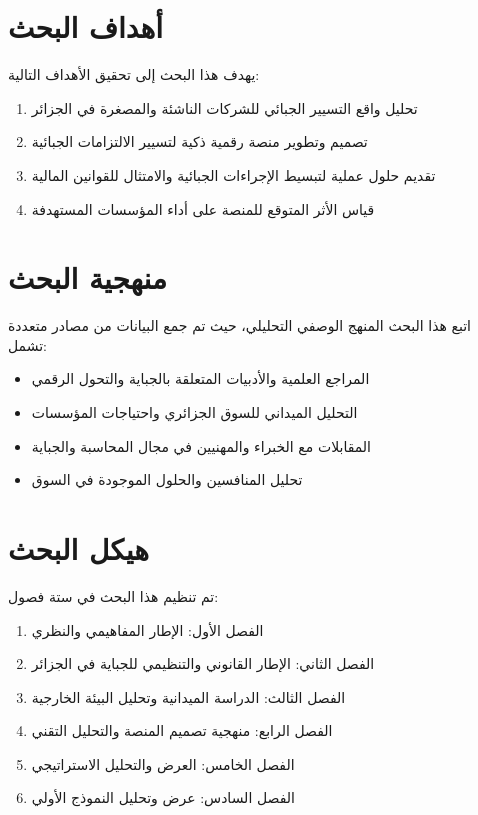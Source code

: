 \documentclass[12pt, a4paper, twoside]{report}
\begin{document}
\section{أهداف البحث}

يهدف هذا البحث إلى تحقيق الأهداف التالية:
\begin{enumerate}
    \item تحليل واقع التسيير الجبائي للشركات الناشئة والمصغرة في الجزائر
    \item تصميم وتطوير منصة رقمية ذكية لتسيير الالتزامات الجبائية
    \item تقديم حلول عملية لتبسيط الإجراءات الجبائية والامتثال للقوانين المالية
    \item قياس الأثر المتوقع للمنصة على أداء المؤسسات المستهدفة
\end{enumerate}

\section{منهجية البحث}

اتبع هذا البحث المنهج الوصفي التحليلي، حيث تم جمع البيانات من مصادر متعددة تشمل:
\begin{itemize}
    \item المراجع العلمية والأدبيات المتعلقة بالجباية والتحول الرقمي
    \item التحليل الميداني للسوق الجزائري واحتياجات المؤسسات
    \item المقابلات مع الخبراء والمهنيين في مجال المحاسبة والجباية
    \item تحليل المنافسين والحلول الموجودة في السوق
\end{itemize}

\section{هيكل البحث}

تم تنظيم هذا البحث في ستة فصول:
\begin{enumerate}
    \item الفصل الأول: الإطار المفاهيمي والنظري
    \item الفصل الثاني: الإطار القانوني والتنظيمي للجباية في الجزائر
    \item الفصل الثالث: الدراسة الميدانية وتحليل البيئة الخارجية
    \item الفصل الرابع: منهجية تصميم المنصة والتحليل التقني
    \item الفصل الخامس: العرض والتحليل الاستراتيجي
    \item الفصل السادس: عرض وتحليل النموذج الأولي
\end{enumerate}
\end{document}
